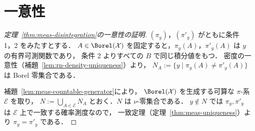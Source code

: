 \section{一意性}

\begin{proof}[定理~\ref{thm:meas-disintegration}の一意性の証明]
  $(\pi_y)$，$(\pi'_y)$ がともに条件 1，2 をみたすとする．
  $A\in\Borel(\mathcal{X})$ を固定すると，$\pi_y(A)$，$\pi'_y(A)$ は $y$ の有界可測関数であり，
  条件 2 よりすべての $B$ で同じ積分値をもつ．
  密度の一意性（補題~\ref{lem:rn-density-uniqueness}）より，
  $N_A:=\{y\mid\pi_y(A)\neq\pi'_y(A)\}$ は Borel 零集合である．

  補題~\ref{lem:meas-countable-generator}により，
  $\Borel(\mathcal{X})$ を生成する可算な $\pi$-系 $\mathcal{E}$ を取り，
  $N:=\bigcup_{A\in\mathcal{E}}N_A$ とおく．$N$ は $\nu$-零集合である．
  $y\notin N$ では $\pi_y,\pi'_y$ は $\mathcal{E}$ 上で一致する確率測度なので，
  一致定理（定理~\ref{thm:meas-uniqueness}）より $\pi_y=\pi'_y$ である．
\end{proof}
